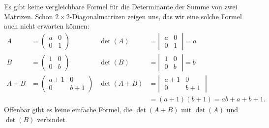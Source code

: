 Es gibt keine vergleichbare Formel für die Determinante der Summe
von zwei Matrizen.
Schon $2\times 2$-Diagonalmatrizen zeigen uns,
das wir eine solche Formel auch nicht erwarten können:
\begin{align*}
A&=\begin{pmatrix}a&0\\0&1\end{pmatrix}&
\det(A)&=\left|\;\begin{matrix}a  &0\\0&  1\end{matrix}\;\right|= a\\
B&=\begin{pmatrix}1&0\\0&b\end{pmatrix}&
\det(B)&=\left|\;\begin{matrix}  1&0\\0&b  \end{matrix}\;\right|= b\\
A+B&=\begin{pmatrix}a+1&0\\0&b+1\end{pmatrix}
&
\det(A+B)&=\left|\;\begin{matrix}a+1&0\\0&b+1\end{matrix}\;\right|\\
&&&=(a+1)(b+1)=ab+a+b+1.
\end{align*}
Offenbar gibt es keine einfache Formel, die $\det(A+B)$ mit $\det(A)$ und
$\det(B)$ verbindet.


